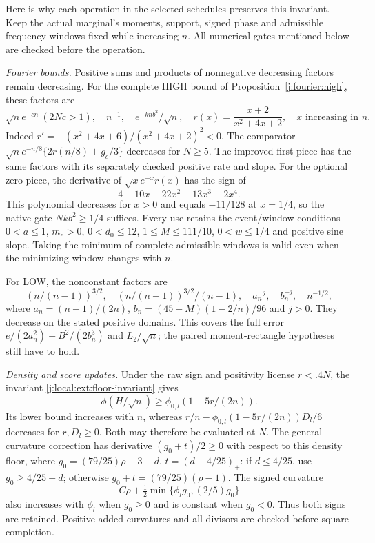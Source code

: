 Here is why each operation in the selected schedules preserves this
invariant. Keep the actual marginal's moments, support, signed phase
and admissible frequency windows fixed while increasing $n$.
All numerical gates mentioned below are checked before the operation.

\emph{Fourier bounds.} Positive sums and products of nonnegative
decreasing factors remain decreasing. For the complete HIGH bound
of Proposition~\ref{j:fourier:high}, these factors are
\[
 \sqrt n e^{-cn}\ (2Nc>1),\quad n^{-1},\quad
 e^{-knb^2}/\sqrt n,\quad
 r(x)=\frac{x+2}{x^2+4x+2},\quad x\text{ increasing in }n.
\]
Indeed $r'=-(x^2+4x+6)/(x^2+4x+2)^2<0$.
The comparator $\sqrt n e^{-n/8}\{2r(n/8)+g_c/3\}$ decreases
for $N\ge5$. The improved first piece has the same factors with
its separately checked positive rate and slope. For the optional zero
piece, the derivative of $\sqrt{x}e^{-x}r(x)$ has the sign of
\[
 4-10x-22x^2-13x^3-2x^4.
\]
This polynomial decreases for $x>0$ and equals $-11/128$ at
$x=1/4$, so the native gate $Nkb^2\ge1/4$ suffices. Every use
retains the event/window conditions $0<a\le1$, $m_e>0$,
$0<d_0\le12$, $1\le M\le111/10$, $0<w\le1/4$ and positive
sine slope. Taking the minimum of complete admissible windows is
valid even when the minimizing window changes with $n$.

For LOW, the nonconstant factors are
\[
 (n/(n-1))^{3/2},\quad (n/(n-1))^{3/2}/(n-1),\quad
 a_n^{-j},\quad b_n^{-j},\quad n^{-1/2},
\]
where $a_n=(n-1)/(2n)$, $b_n=(45-M)(1-2/n)/96$ and $j>0$.
They decrease on the stated positive domains. This covers the full
error $e/(2a_n^2)+B^2/(2b_n^3)$ and $L_2/\sqrt n$; the paired
moment-rectangle hypotheses still have to hold.

\emph{Density and score updates.} Under the raw sign and positivity
license $r<.4N$, the invariant \eqref{j:local:ext:floor-invariant} gives
\[
 \phi(H/\sqrt n)\ge\phi_{0,l}(1-5r/(2n)).
\]
Its lower bound increases with $n$, whereas
$r/n-\phi_{0,l}(1-5r/(2n))D_l/6$ decreases for $r,D_l\ge0$.
Both may therefore be evaluated at $N$. The general curvature
correction has derivative $(g_0+t)/2\ge0$ with respect to this
density floor, where $g_0=(79/25)\rho-3-d$, $t=(d-4/25)_+$:
if $d\le4/25$, use $g_0\ge4/25-d$; otherwise
$g_0+t=(79/25)(\rho-1)$. The signed curvature
\[
 C\rho+\tfrac12\min\{\phi_lg_0,(2/5)g_0\}
\]
also increases with $\phi_l$ when $g_0\ge0$ and is constant
when $g_0<0$. Thus both signs are retained. Positive added
curvatures and all divisors are checked before square completion.


